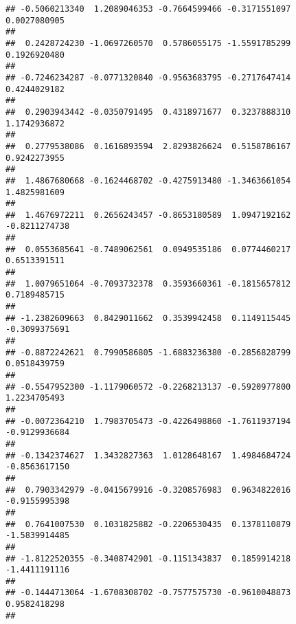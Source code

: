 \documentclass[]{article}
\begin{document}
\begin{verbatim}
## -0.5060213340  1.2089046353 -0.7664599466 -0.3171551097  0.0027080905 
##                                                                       
##  0.2428724230 -1.0697260570  0.5786055175 -1.5591785299  0.1926920480 
##                                                                       
## -0.7246234287 -0.0771320840 -0.9563683795 -0.2717647414  0.4244029182 
##                                                                       
##  0.2903943442 -0.0350791495  0.4318971677  0.3237888310  1.1742936872 
##                                                                       
##  0.2779538086  0.1616893594  2.8293826624  0.5158786167  0.9242273955 
##                                                                       
##  1.4867680668 -0.1624468702 -0.4275913480 -1.3463661054  1.4825981609 
##                                                                       
##  1.4676972211  0.2656243457 -0.8653180589  1.0947192162 -0.8211274738 
##                                                                       
##  0.0553685641 -0.7489062561  0.0949535186  0.0774460217  0.6513391511 
##                                                                       
##  1.0079651064 -0.7093732378  0.3593660361 -0.1815657812  0.7189485715 
##                                                                       
## -1.2382609663  0.8429011662  0.3539942458  0.1149115445 -0.3099375691 
##                                                                       
## -0.8872242621  0.7990586805 -1.6883236380 -0.2856828799  0.0518439759 
##                                                                       
## -0.5547952300 -1.1179060572 -0.2268213137 -0.5920977800  1.2234705493 
##                                                                       
## -0.0072364210  1.7983705473 -0.4226498860 -1.7611937194 -0.9129936684 
##                                                                       
## -0.1342374627  1.3432827363  1.0128648167  1.4984684724 -0.8563617150 
##                                                                       
##  0.7903342979 -0.0415679916 -0.3208576983  0.9634822016 -0.9155995398 
##                                                                       
##  0.7641007530  0.1031825882 -0.2206530435  0.1378110879 -1.5839914485 
##                                                                       
## -1.8122520355 -0.3408742901 -0.1151343837  0.1859914218 -1.4411191116 
##                                                                       
## -0.1444713064 -1.6708308702 -0.7577575730 -0.9610048873  0.9582418298 
##                                                                       

\end{verbatim}
\end{document}
